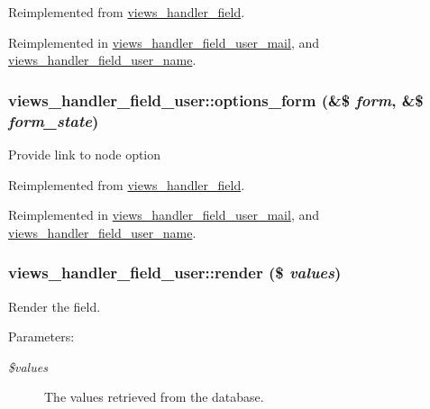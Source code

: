 Reimplemented from \hyperlink{classviews__handler__field_64c69a8a3697603f8283405071c25b76}{views\_\-handler\_\-field}.

Reimplemented in \hyperlink{classviews__handler__field__user__mail_747c64da5c9bdbd55c7a8908779db5a1}{views\_\-handler\_\-field\_\-user\_\-mail}, and \hyperlink{classviews__handler__field__user__name_11092f8f1854e14f245b644a2fed8434}{views\_\-handler\_\-field\_\-user\_\-name}.\hypertarget{classviews__handler__field__user_ecf77682fa7dc9daf1fa97cbe045420d}{
\subsubsection[{options\_\-form}]{\setlength{\rightskip}{0pt plus 5cm}views\_\-handler\_\-field\_\-user::options\_\-form (\&\$ {\em form}, \/  \&\$ {\em form\_\-state})}}
\label{classviews__handler__field__user_ecf77682fa7dc9daf1fa97cbe045420d}


Provide link to node option 

Reimplemented from \hyperlink{classviews__handler__field_0435d161922b7b4b84f02a2e79bb947a}{views\_\-handler\_\-field}.

Reimplemented in \hyperlink{classviews__handler__field__user__mail_ee55735f96178173853dbf1f8b293216}{views\_\-handler\_\-field\_\-user\_\-mail}, and \hyperlink{classviews__handler__field__user__name_0c3b7db3d060e384287fa62f348c9387}{views\_\-handler\_\-field\_\-user\_\-name}.\hypertarget{classviews__handler__field__user_145dcce889ee17821a1d9c65970d86f2}{
\subsubsection[{render}]{\setlength{\rightskip}{0pt plus 5cm}views\_\-handler\_\-field\_\-user::render (\$ {\em values})}}
\label{classviews__handler__field__user_145dcce889ee17821a1d9c65970d86f2}


Render the field.

\begin{Desc}
\item[Parameters:]
\begin{description}
\item[{\em \$values}]The values retrieved from the database. \end{description}
\end{Desc}


